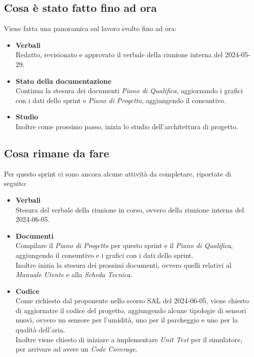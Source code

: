 \documentclass[italian,12pt]{article}
\begin{document}
\subsection{Cosa è stato fatto fino ad ora}
Viene fatta una panoramica sul lavoro svolto fino ad ora:
\begin{itemize}
	\item \textbf{Verbali} \\
		  Redatto, revisionato e approvato il verbale della riunione interna del 2024-05-29.
	\item \textbf{Stato della documentazione} \\
		  Continua la stesura dei documenti \textit{Piano di Qualifica}, aggiornando i grafici con i dati dello sprint e \textit{Piano di Progetto}, aggiungendo il consuntivo.
	\item \textbf{Studio} \\
		  Inoltre come prossimo passo, inizia lo studio dell'architettura di progetto.
\end{itemize}

\subsection{Cosa rimane da fare}
Per questo sprint ci sono ancora alcune attività da completare, riportate di seguito:
\begin{itemize}
	\item \textbf{Verbali} \\
		  Stesura del verbale della riunione in corso, ovvero della riunione interna del 2024-06-05.
	\item \textbf{Documenti} \\
		  Compilare il \textit{Piano di Progetto} per questo sprint e il \textit{Piano di Qualifica}, aggiungendo il consuntivo e i grafici con i dati dello sprint. \\
		  Inoltre inizia la stesura dei prossimi documenti, ovvero quelli relativi al \textit{Manuale Utente} e alla \textit{Scheda Tecnica}.
	\item \textbf{Codice} \\
		  Come richiesto dal proponente nello scorso SAL del 2024-06-05, viene chiesto di aggiornatre il codice del progetto, aggiungendo alcune tipologie di sensori nuovi, ovvero un sensore per l'umidità, uno per il parcheggio e uno per la qualità dell'aria. \\
		  Inoltre viene chiesto di iniziare a implementare \textit{Unit Test} per il simulatore, per arrivare ad avere un \textit{Code Coverage}.
\end{itemize}
\end{document}
